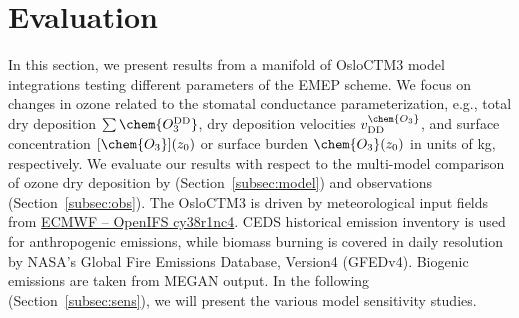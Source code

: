 \documentclass[gmd, manuscript]{copernicus}
\begin{document}
\section{Evaluation}
\label{sec:eval}
In this section, we present results from a manifold of OsloCTM3 model integrations testing different parameters of the EMEP scheme. We focus on changes in ozone related to the stomatal conductance parameterization, e.g., total dry deposition $\sum\chem{O_3^\text{DD}}$, dry deposition velocities $v^\chem{O_3}_\text{DD}$, and surface concentration $[\chem{O_3}](z_0)$ or surface burden $\chem{O_3}(z_0)$ in units of \unit{kg}, respectively. We evaluate our results with respect to the multi-model comparison of ozone dry deposition by \citet{ACP:Hardacre2015} (Section~\ref{subsec:model}) and observations (Section~\ref{subsec:obs}). The OsloCTM3 is driven by meteorological input fields from \href{https://www.ecmwf.int/en/forecasts/documentation-and-support/evolution-ifs/cycle-38r1-summary-changes}{ECMWF -- OpenIFS cy38r1nc4}. CEDS historical emission inventory is used for anthropogenic emissions, while biomass burning is covered in daily resolution by NASA's Global Fire Emissions Database, Version4 (GFEDv4). Biogenic emissions are taken from MEGAN output. In the following (Section~\ref{subsec:sens}), we will present the various model sensitivity studies.
\end{document}
